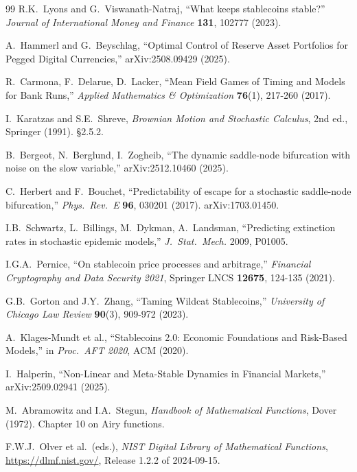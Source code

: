 \documentclass[11pt,a4paper]{article}
\theoremstyle{plain}
\theoremstyle{definition}
\begin{document}
\begin{thebibliography}{99}
 R.K.~Lyons and G.~Viswanath-Natraj, ``What keeps stablecoins stable?'' \textit{Journal of International Money and Finance} \textbf{131}, 102777 (2023).

 A.~Hammerl and G.~Beyschlag, ``Optimal Control of Reserve Asset Portfolios for Pegged Digital Currencies,'' arXiv:2508.09429 (2025).

 R.~Carmona, F.~Delarue, D.~Lacker, ``Mean Field Games of Timing and Models for Bank Runs,'' \textit{Applied Mathematics \& Optimization} \textbf{76}(1), 217-260 (2017).

 I.~Karatzas and S.E.~Shreve, \textit{Brownian Motion and Stochastic Calculus}, 2nd ed., Springer (1991). \S 2.5.2.

 B.~Bergeot, N.~Berglund, I.~Zogheib, ``The dynamic saddle-node bifurcation with noise on the slow variable,'' arXiv:2512.10460 (2025).

 C.~Herbert and F.~Bouchet, ``Predictability of escape for a stochastic saddle-node bifurcation,'' \textit{Phys.\ Rev.\ E} \textbf{96}, 030201 (2017). arXiv:1703.01450.

 I.B.~Schwartz, L.~Billings, M.~Dykman, A.~Landsman, ``Predicting extinction rates in stochastic epidemic models,'' \textit{J.\ Stat.\ Mech.} 2009, P01005.

 I.G.A.~Pernice, ``On stablecoin price processes and arbitrage,'' \textit{Financial Cryptography and Data Security 2021}, Springer LNCS \textbf{12675}, 124-135 (2021).

 G.B.~Gorton and J.Y.~Zhang, ``Taming Wildcat Stablecoins,'' \textit{University of Chicago Law Review} \textbf{90}(3), 909-972 (2023).

 A.~Klages-Mundt et al., ``Stablecoins 2.0: Economic Foundations and Risk-Based Models,'' in \textit{Proc.\ AFT 2020}, ACM (2020).

 I.~Halperin, ``Non-Linear and Meta-Stable Dynamics in Financial Markets,'' arXiv:2509.02941 (2025).

 M.~Abramowitz and I.A.~Stegun, \textit{Handbook of Mathematical Functions}, Dover (1972). Chapter 10 on Airy functions.

 F.W.J.~Olver et al.\ (eds.), \textit{NIST Digital Library of Mathematical Functions}, \url{https://dlmf.nist.gov/}, Release 1.2.2 of 2024-09-15.


\end{thebibliography}
\end{document}
